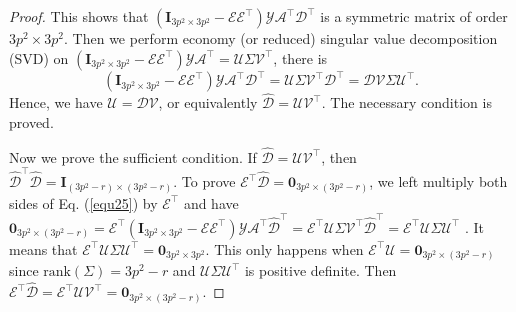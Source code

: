 \begin{proof}
This shows that $(\bm{I}_{3p^2\times 3p^2}-\mathcal{E}\mathcal{E}^{\top})\mathcal{Y}\mathcal{A}^{\top}\mathcal{D}^{\top}$ is a symmetric matrix of order $3p^2\times 3p^2$. Then we perform economy (or reduced) singular value decomposition (SVD)  \cite{eckart1936approximation} on $(\bm{I}_{3p^2\times 3p^2}-\mathcal{E}\mathcal{E}^{\top})\mathcal{Y}\mathcal{A}^{\top}=\mathcal{U}\Sigma\mathcal{V}^{\top}$,
there is
\begin{equation}\label{equ25}
(\bm{I}_{3p^2\times 3p^2}-\mathcal{E}\mathcal{E}^{\top})\mathcal{Y}\mathcal{A}^{\top}\mathcal{D}^{\top}
=
\mathcal{U}\Sigma\mathcal{V}^{\top}\mathcal{D}^{\top}
=
\mathcal{D}\mathcal{V}\Sigma\mathcal{U}^{\top}.
\end{equation}
Hence, we have $\mathcal{U}=\mathcal{D}\mathcal{V}$, or equivalently $\hat{\mathcal{D}}=\mathcal{U}\mathcal{V}^{\top}$. The necessary condition is proved. 

Now we prove the sufficient condition. If $\hat{\mathcal{D}}=\mathcal{U}\mathcal{V}^{\top}$, then $\hat{\mathcal{D}}^{\top}\hat{\mathcal{D}}=\bm{I}_{(3p^2-r)\times (3p^2-r)}$. To prove $\mathcal{E}^{\top}\hat{\mathcal{D}}=\bm{0}_{3p^2\times (3p^2-r)}$, we left multiply both sides of Eq. (\ref{equ25}) by $\mathcal{E}^{\top}$ and have  
$
\bm{0}_{3p^2\times (3p^2-r)}
=
\mathcal{E}^{\top}(\bm{I}_{3p^2\times 3p^2}-\mathcal{E}\mathcal{E}^{\top})\mathcal{Y}\mathcal{A}^{\top}\hat{\mathcal{D}}^{\top}
=
\mathcal{E}^{\top}\mathcal{U}\Sigma\mathcal{V}^{\top}\hat{\mathcal{D}}^{\top}
=
\mathcal{E}^{\top}\mathcal{U}\Sigma\mathcal{U}^{\top}
$
.
It means that $\mathcal{E}^{\top}\mathcal{U}\Sigma\mathcal{U}^{\top}=\bm{0}_{3p^2\times 3p^2}$. This only happens when $\mathcal{E}^{\top}\mathcal{U}=\bm{0}_{3p^2\times (3p^2-r)}$ since $\text{rank}(\Sigma)=3p^2-r$ and $\mathcal{U}\Sigma\mathcal{U}^{\top}$ is positive definite. Then $\mathcal{E}^{\top}\hat{\mathcal{D}}=\mathcal{E}^{\top}\mathcal{U}\mathcal{V}^{\top}=\bm{0}_{3p^2\times (3p^2-r)}$. 


\end{proof}
